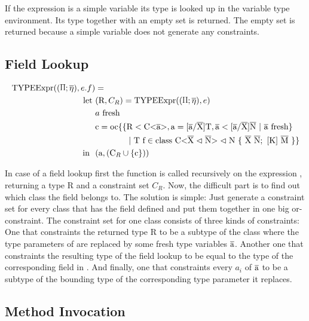If the expression is a simple variable its type is looked up in the variable type environment. Its type together with an empty set is returned. The empty set is returned because a simple variable does not generate any constraints.

\subsection{Field Lookup}

\begin{align*}
    \texpr{e.f} &= \\
    \text{let} \ &( \text{R}, C_R ) = \texpr{e} \\
    &\fresh{a} \\
    &\text{c} = \text{oc} \{ \{ \text{R} < \text{C<} \ot{a} \text{>}, \text{a} = \tsxsn{a}{X}{T}, \ot{a} < \tsxsns{a}{X}{N} \ | \ \fresh{\ot{a}} \} \\
    & \quad \quad \quad \quad | \ \text{T f} \in \class{X}{N} \}\\
    \text{in} \ \ & (\text{a}, (\text{C}_R \cup \{ \text{c} \} ))
\end{align*}

In case of a field lookup  first the  function is called recursively on the expression , returning a
type R and a constraint set $C_R$. Now, the difficult part is to find out which class the field  belongs to. The solution is simple:
Just generate a constraint set for every class  that has the field  defined and put them together in one big or-constraint.
The constraint set for one class consists of three kinds of constraints: One that constraints the returned type R to be a subtype
of the class  where the type parameters of  are replaced by some fresh type variables $\overline{\text{a}}$. Another one that constraints the resulting type of the field lookup
to be equal to the type of the corresponding field in . And finally, one that constraints every $a_i$ of $\overline{\text{a}}$ to be a subtype of the bounding type of the corresponding type parameter it replaces.

\subsection{Method Invocation}

